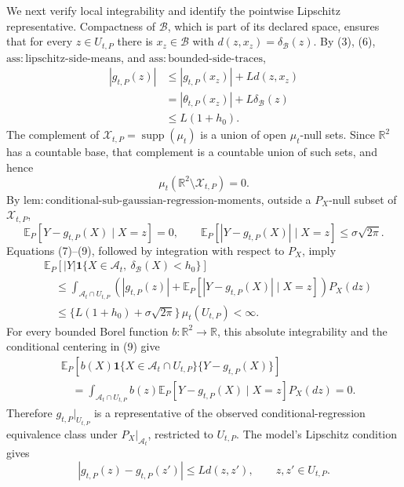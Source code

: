 We next verify local integrability and identify the pointwise Lipschitz representative. Compactness of \(\mathcal B\), which is part of its declared space, ensures that for every \(z\in U_{t,P}\) there is \(x_z\in\mathcal B\) with \(d(z,x_z)=\delta_{\mathcal B}(z)\). By (3), (6), \(\mathrm{ass:lipschitz\text{-}side\text{-}means}\), and \(\mathrm{ass:bounded\text{-}side\text{-}traces}\),
\[
 \begin{aligned}
 |g_{t,P}(z)|
 &\le |g_{t,P}(x_z)|+Ld(z,x_z)\\
 &=|\theta_{t,P}(x_z)|+L\delta_{\mathcal B}(z)\\
 &\le L(1+h_0).
 \end{aligned}
 \tag{7}
\]
The complement of \(\mathcal X_{t,P}=\operatorname{supp}(\mu_t)\) is a union of open \(\mu_t\)-null sets. Since \(\mathbb R^2\) has a countable base, that complement is a countable union of such sets, and hence
\[
 \mu_t(\mathbb R^2\setminus\mathcal X_{t,P})=0.
 \tag{8}
\]
By \(\mathrm{lem:conditional\text{-}sub\text{-}gaussian\text{-}regression\text{-}moments}\), outside a \(P_X\)-null subset of \(\mathcal X_{t,P}\),
\[
 \mathbb E_P[Y-g_{t,P}(X)\mid X=z]=0,
 \qquad
 \mathbb E_P[|Y-g_{t,P}(X)|\mid X=z]\le\sigma\sqrt{2\pi}.
 \tag{9}
\]
Equations (7)--(9), followed by integration with respect to \(P_X\), imply
\[
 \begin{aligned}
 &\mathbb E_P\!\left[|Y|\mathbf 1\{X\in\mathcal A_t,\ \delta_{\mathcal B}(X)<h_0\}\right]\\
 &\quad\le
 \int_{\mathcal A_t\cap U_{t,P}}
 \left(|g_{t,P}(z)|+\mathbb E_P[|Y-g_{t,P}(X)|\mid X=z]\right)P_X(dz)\\
 &\quad\le
 \{L(1+h_0)+\sigma\sqrt{2\pi}\}\,\mu_t(U_{t,P})<\infty.
 \end{aligned}
 \tag{10}
\]
For every bounded Borel function \(b:\mathbb R^2\to\mathbb R\), this absolute integrability and the conditional centering in (9) give
\[
 \begin{aligned}
 &\mathbb E_P\!\left[b(X)\mathbf 1\{X\in\mathcal A_t\cap U_{t,P}\}
       \{Y-g_{t,P}(X)\}\right]\\
 &\quad=
 \int_{\mathcal A_t\cap U_{t,P}}b(z)
       \mathbb E_P[Y-g_{t,P}(X)\mid X=z]P_X(dz)=0.
 \end{aligned}
 \tag{11}
\]
Therefore \(g_{t,P}|_{U_{t,P}}\) is a representative of the observed conditional-regression equivalence class under \(P_X|_{\mathcal A_t}\), restricted to \(U_{t,P}\). The model's Lipschitz condition gives
\[
 |g_{t,P}(z)-g_{t,P}(z')|\le Ld(z,z'),
 \qquad z,z'\in U_{t,P}.
 \tag{12}
\]

